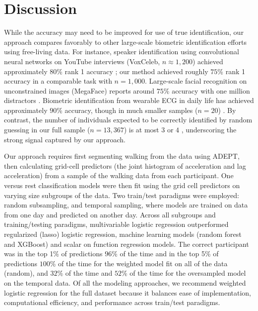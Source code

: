 \section{Discussion}
While the accuracy may need to be improved for use of true identification, our approach compares favorably to other large-scale biometric identification efforts using free-living data. For instance, speaker identification using convolutional neural networks on YouTube interviews (VoxCeleb, $n\approx 1{,}200$) achieved approximately $80$\% rank 1 accuracy \citep{voxceleb}; our method achieved roughly $75$\% rank 1 accuracy in a comparable task with $n=1{,}000$. Large-scale facial recognition on unconstrained images (MegaFace) reports around $75$\% accuracy with one million distractors \citep{megaface}. Biometric identification from wearable ECG in daily life has achieved approximately $90$\% accuracy, though in much smaller samples ($n=20$) \citep{ecg_wild}. By contrast, the number of individuals expected to be correctly identified by random guessing in our full sample ($n=13{,}367$) is at most $3$ or $4$ \citep{poisson_fprint}, underscoring the strong signal captured by our approach.

Our approach requires first segmenting walking from the data using ADEPT, then calculating grid-cell predictors (the joint histogram of acceleration and lag acceleration) from a sample of the walking data from each participant. One versus rest classification models were then fit using the grid cell predictors on varying size subgroups of the data. Two train/test paradigms were employed: random subsampling, and temporal sampling, where models are trained on data from one day and predicted on another day. 
Across all subgroups and training/testing paradigms, multivariable logistic regression outperformed regularized (lasso) logistic regression, machine learning models (random forest and XGBoost) and scalar on function regression models. The correct participant was in the top 1\% of predictions $96$\% of the time and in the top 5\% of predictions $100$\% of the time for the weighted model fit on all of the data (random), and $32$\% of the time and $52$\% of the time for the oversampled model on the temporal data. Of all the modeling approaches, we recommend weighted logistic regression for the full dataset because it balances ease of implementation, computational efficiency, and performance across train/test paradigms.


